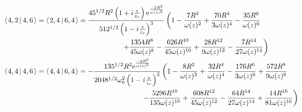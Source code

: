 \documentclass[11pt]{amsart}
\makeatletter
\newcommand{\e}{{\rm e}}				%
\newcommand{\msp}[1]{\mspace{#1mu}}		%
\newcommand{\0}{\varnothing}		%
\newcommand{\brac}[2]{\left\langle\msp{2} #1\left\lvert \msp{3.5} #2 \right.\right\rangle}	%
\newcommand{\1}{!}
\newcommand{\2}{@}
\newcommand{\3}{\#}
\newcommand{\4}{\$}
\newcommand{\5}{\%}
\newcommand{\6}{$^\wedge$}
\newcommand{\7}{\&}
\newcommand{\8}{*}
\newcommand{\9}{(}
\makeatother
\begin{document}
\begin{align*}
\\
&
\brac{4,2}{4,6} =\brac{2,4}{6,4} = \frac{45^{1/2}R^2\left(1+i\frac{z}{z_r}\right)\e^{\frac{-2R^2}{\omega(z)^2}}}{512^{1/2}\left(1-i\frac{z}{z_r}\right)^3}\left(1-\frac{7R^2}{\omega(z)^2}+\frac{70R^4}{3\omega(z)^4}-\frac{35R^6}{\omega(z)^6}
\right.
\\
&
\left.\msp{300}+\frac{1354R^8}{45\omega(z)^8}-\frac{626R^{10}}{45\omega(z)^{10}}+\frac{28R^{12}}{9\omega(z)^{12}}-\frac{7R^{14}}{27\omega(z)^{14}}\right)
\\
&
\brac{4,4}{4,6} = \brac{4,4}{6,4} = -\frac{135^{1/2}R^2\e^{\frac{-2R^2}{\omega(z)^2}}}{2048^{1/2}\omega_0^2\left(1-i\frac{z}{z_r}\right)^2}\left(1-\frac{8R^2}{\omega(z)^2} + \frac{32R^4}{\omega(z)^4} - \frac{176R^6}{3\omega(z)^6}+\frac{572R^{8}}{9\omega(z)^{8}}\right.
\\
&
\msp{350}\left.-\frac{5296R^{10}}{135\omega(z)^{10}}+\frac{608R^{12}}{45\omega(z)^{12}}-\frac{64R^{14}}{27\omega(z)^{14}}+\frac{14R^{16}}{81\omega(z)^{16}}\right)
 \end{align*}
\end{document}
